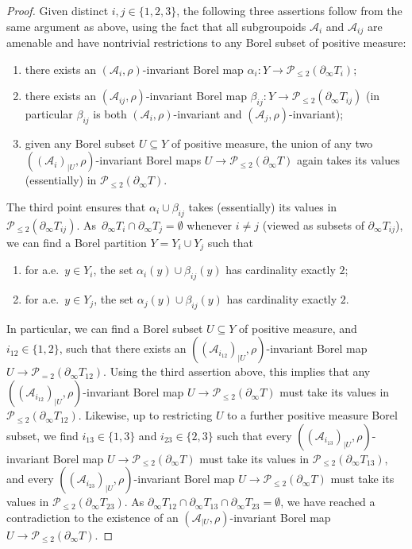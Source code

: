 \documentclass[JEP,XML,SOM,Unicode,NoFloatCountersInSection,published]{cedram}
\let\mathcal\mathscr
\theoremstyle{plain}
\theoremstyle{definition}
\newcommand{\cala}{\mathcal{A}}
\newcommand{\calp}{\mathcal{P}}
\begin{document}
\begin{proof}
Given distinct $i,j\in\{1,2,3\}$, the following three assertions follow from the same argument as above, using the fact that all subgroupoids $\cala_i$ and $\cala_{ij}$ are amenable and have nontrivial restrictions to any Borel subset of positive measure:
\begin{enumerate}
\item there exists an $(\cala_i,\rho)$-invariant Borel map $\alpha_i:Y\to\calp_{\le 2}(\partial_\infty T_i)$;
\item there exists an $(\cala_{ij},\rho)$-invariant Borel map $\beta_{ij}:Y\to\calp_{\le 2}(\partial_\infty T_{ij})$ (in particular $\beta_{ij}$ is both $(\cala_i,\rho)$-invariant and $(\cala_j,\rho)$-invariant);
\item given any Borel subset $U\subseteq Y$ of positive measure, the union of any two $((\cala_i)_{|U},\rho)$-invariant Borel maps $U\to\calp_{\le 2}(\partial_\infty T)$ again takes its values (essentially) in $\calp_{\le 2}(\partial_\infty T)$.
\end{enumerate}
The third point ensures that $\alpha_i\cup\beta_{ij}$ takes (essentially) its values in $\calp_{\le 2}(\partial_\infty T_{ij})$. As~$\partial_\infty T_i\cap\partial_\infty T_j=\emptyset$ whenever $i\neq j$ (viewed as subsets of $\partial_\infty T_{ij}$), we can find a Borel partition $Y=Y_i\cup Y_j$ such that
\begin{enumerate}
\item for a.e.\ $y\in Y_i$, the set $\alpha_i(y)\cup\beta_{ij}(y)$ has cardinality exactly $2$;
\item for a.e.\ $y\in Y_j$, the set $\alpha_j(y)\cup\beta_{ij}(y)$ has cardinality exactly $2$.
\end{enumerate}
In particular, we can find a Borel subset $U\!\subseteq\! Y$ of positive measure, and $i_{12}\!\in\!\{1,2\}$, such that there exists an $((\cala_{i_{12}})_{|U},\rho)$-invariant Borel map $U\to\calp_{=2}(\partial_\infty T_{12})$. Using the third assertion above, this implies that any $((\cala_{i_{12}})_{|U},\rho)$-invariant Borel map $U\to\calp_{\le 2}(\partial_\infty T)$ must take its values in $\calp_{\le 2}(\partial_\infty T_{12})$. Likewise, up to restricting $U$ to a further positive measure Borel subset, we find $i_{13}\in\{1,3\}$ and $i_{23}\in\{2,3\}$ such that every $((\cala_{i_{13}})_{|U},\rho)$-invariant Borel map $U\to\calp_{\le 2}(\partial_\infty T)$ must take its values in $\calp_{\le 2}(\partial_\infty T_{13})$, and every $((\cala_{i_{23}})_{|U},\rho)$-invariant Borel map $U\to\calp_{\le 2}(\partial_\infty T)$ must take its values in $\calp_{\le 2}(\partial_\infty T_{23})$. As $\partial_\infty T_{12}\cap\partial_\infty T_{13}\cap\partial_\infty T_{23}=\emptyset$, we have reached a contradiction to the existence of an $(\cala_{|U},\rho)$-invariant Borel map $U\to\calp_{\le 2}(\partial_\infty T)$.
\end{proof}
\end{document}
